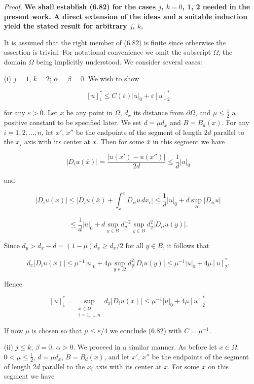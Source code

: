 \textit{Proof.} \textbf{We shall establish (6.82) for the cases $j$, $k=0$, 1, 2 needed in the present
work. A direct extension of the ideas and a suitable induction yield the stated result
for arbitrary $j$, $k$.}

It is assumed that the right member of (6.82) is finite since otherwise the assertion is trivial. For notational convenience we omit the subscript $\Omega$, the domain $\Omega$
being implicitly understood. We consider several cases:

\qquad (i) $j=1$, $k=2$; $\alpha=\beta=0$. We wish to show

\begin{equation}
\tag{6.83}
[u]^*_1\leq C(\varepsilon)|u|_0+\varepsilon [u]^*_2
\end{equation}



for any $\varepsilon>0$. Let $x$ be any point in $\Omega$, $d_x$ its distance from $\partial\Omega$, and $\mu\le \frac12$ a positive constant to be specified later. We set $d=\mu d_x$ and $B=B_d(x)$. For any $i=1,2,\dots,n$, let $x'$, $x''$ be the endpoints of the segment of length $2d$ parallel to the $x_i$ axis with its center at $x$. Then for some $\bar{x}$ in this segment we have

\[
\lvert D_i u(\bar{x})\rvert=\frac{\lvert u(x')-u(x'')\rvert}{2d}\le \frac{1}{d}\lvert u\rvert_0
\]

and

\[
\lvert D_i u(x)\rvert\le \lvert D_i u(\bar{x})+\int_{\bar{x}}^x D_{ii}u\,dx_i\rvert
\le \frac{1}{d}\lvert u\rvert_0+d\sup_B \lvert D_{ii}u\rvert
\]

\[
\le \frac{1}{d}\lvert u\rvert_0+d\sup_{y\in B} d_y^{-2}\sup_{y\in B} d_y^2\lvert D_{ii}u(y)\rvert.
\]

Since $d_y>d_x-d=(1-\mu)d_x\ge d_x/2$ for all $y\in B$, it follows that

\[
d_x\lvert D_i u(x)\rvert\le \mu^{-1}\lvert u\rvert_0+4\mu\sup_{y\in\Omega} d_y^2\lvert D_i u(y)\rvert\le \mu^{-1}\lvert u\rvert_0+4\mu [u]_2^*.
\]

Hence

\[
[u]_1^*=\sup_{\substack{x\in\Omega\\ i=1,\dots,n}} d_x\lvert D_i u(x)\rvert\le \mu^{-1}\lvert u\rvert_0+4\mu [u]_2^*.
\]

If now $\mu$ is chosen so that $\mu\le \varepsilon/4$ we conclude (6.82) with $C=\mu^{-1}$.

(ii) $j\le k$; $\beta=0$, $\alpha>0$. We proceed in a similar manner. As before let $x\in\Omega$, $0<\mu\le \frac12$, $d=\mu d_x$, $B=B_d(x)$, and let $x'$, $x''$ be the endpoints of the segment of length $2d$ parallel to the $x_i$ axis with its center at $x$. For some $\bar{x}$ on this segment we have

